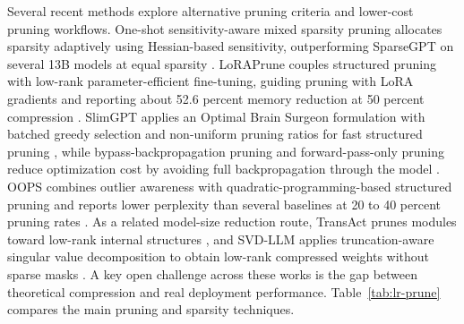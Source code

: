 \documentclass[
11pt, %
english, %
singlespacing, %
headsepline, %
]{MastersDoctoralThesis} %
\begin{document}
Several recent methods explore alternative pruning criteria and lower-cost pruning workflows. One-shot sensitivity-aware mixed sparsity pruning allocates sparsity adaptively using Hessian-based sensitivity, outperforming SparseGPT on several 13B models at equal sparsity \cite{shao2024sensitivity}. LoRAPrune couples structured pruning with low-rank parameter-efficient fine-tuning, guiding pruning with LoRA gradients and reporting about 52.6 percent memory reduction at 50 percent compression \cite{zhang2024loraprune}. SlimGPT applies an Optimal Brain Surgeon formulation with batched greedy selection and non-uniform pruning ratios for fast structured pruning \cite{ling2024slimgpt}, while bypass-backpropagation pruning and forward-pass-only pruning reduce optimization cost by avoiding full backpropagation through the model \cite{kolawole2026bonsai,gao2025bypass}. OOPS combines outlier awareness with quadratic-programming-based structured pruning and reports lower perplexity than several baselines at 20 to 40 percent pruning rates \cite{survey2026oops}. As a related model-size reduction route, TransAct prunes modules toward low-rank internal structures \cite{shen2024transact}, and SVD-LLM applies truncation-aware singular value decomposition to obtain low-rank compressed weights without sparse masks \cite{wang2025svdllm}. A key open challenge across these works is the gap between theoretical compression and real deployment performance. Table~\ref{tab:lr-prune} compares the main pruning and sparsity techniques.
\end{document}
